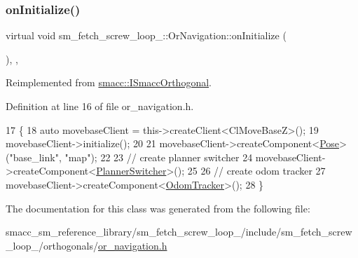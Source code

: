 \subsubsection{\texorpdfstring{on\+Initialize()}{onInitialize()}}
{\footnotesize\ttfamily virtual void sm\+\_\+fetch\+\_\+screw\+\_\+loop\+\_\+::\+Or\+Navigation\+::on\+Initialize (\begin{DoxyParamCaption}{ }\end{DoxyParamCaption})\hspace{0.3cm}{\ttfamily [inline]}, {\ttfamily [override]}, {\ttfamily [virtual]}}



Reimplemented from \hyperlink{classsmacc_1_1ISmaccOrthogonal_a6bb31c620cb64dd7b8417f8705c79c7a}{smacc\+::\+I\+Smacc\+Orthogonal}.



Definition at line 16 of file or\+\_\+navigation.\+h.


\begin{DoxyCode}
17     \{
18         \textcolor{keyword}{auto} movebaseClient = this->createClient<ClMoveBaseZ>();
19         movebaseClient->initialize();
20 
21         movebaseClient->createComponent<\hyperlink{classcl__move__base__z_1_1Pose}{Pose}>(\textcolor{stringliteral}{"base\_link"}, \textcolor{stringliteral}{"map"});
22 
23         \textcolor{comment}{// create planner switcher}
24         movebaseClient->createComponent<\hyperlink{classcl__move__base__z_1_1PlannerSwitcher}{PlannerSwitcher}>();
25 
26         \textcolor{comment}{// create odom tracker}
27         movebaseClient->createComponent<\hyperlink{classcl__move__base__z_1_1odom__tracker_1_1OdomTracker}{OdomTracker}>();
28     \}
\end{DoxyCode}


The documentation for this class was generated from the following file\+:\begin{DoxyCompactItemize}
\item 
smacc\+\_\+sm\+\_\+reference\+\_\+library/sm\+\_\+fetch\+\_\+screw\+\_\+loop\+\_/include/sm\+\_\+fetch\+\_\+screw\+\_\+loop\+\_/orthogonals/\hyperlink{sm__fetch__screw__loop__1_2include_2sm__fetch__screw__loop__1_2orthogonals_2or__navigation_8h}{or\+\_\+navigation.\+h}\end{DoxyCompactItemize}
